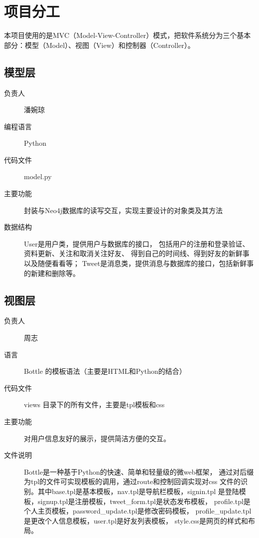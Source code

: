 \documentclass{yaldc}
\begin{document}
\section{项目分工}
本项目使用的是MVC（Model-View-Controller）模式，把软件系统分为三个基本
部分：模型（Model）、视图（View）和控制器（Controller）。

\subsection{模型层}

\begin{description}
    \item[负责人] 潘婉琼
    \item[编程语言] Python
    \item[代码文件] model.py
    \item[主要功能] 封装与Neo4j数据库的读写交互，实现主要设计的对象类及其方法
    \item[数据结构] User是用户类，提供用户与数据库的接口，
        包括用户的注册和登录验证、资料更新、关注和取消关注好友、
        得到自己的时间线、得到好友的新鲜事以及随便看看等；
        Tweet是消息类，提供消息与数据库的接口，包括新鲜事的新建和删除等。
\end{description}

\subsection{视图层}

\begin{description}
    \item[负责人] 周志
    \item[语言] Bottle 的模板语法（主要是HTML和Python的结合）
    \item[代码文件] views 目录下的所有文件，主要是tpl模板和css
    \item[主要功能] 对用户信息友好的展示，提供简洁方便的交互。
    \item[文件说明] Bottle是一种基于Python的快速、简单和轻量级的微web框架，
        通过对后缀为tpl的文件可实现模板的调用，通过route和控制回调实现对css
        文件的识别。其中base.tpl是基本模板，nav.tpl是导航栏模板，signin.tpl
        是登陆模板，signup.tpl是注册模板，tweet\_form.tpl是状态发布模板，
        profile.tpl是个人主页模板，password\_update.tpl是修改密码模板，
        profile\_update.tpl是更改个人信息模板，user.tpl是好友列表模板，
        style.css是网页的样式和布局。
\end{description}
\end{document}
